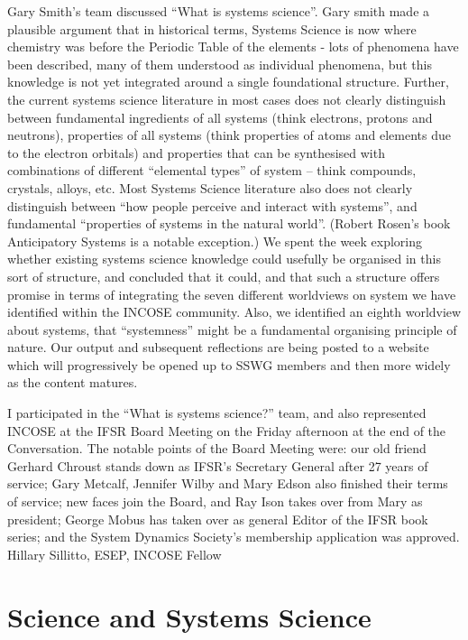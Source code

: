 Gary Smith’s team discussed ``What is systems science''. Gary smith made a plausible argument that in historical terms, Systems Science is now where chemistry was before the Periodic Table of the elements - lots of phenomena have been described, many of them understood as individual phenomena, but this knowledge is not yet integrated around a single foundational structure. Further, the current systems science literature in most cases does not clearly distinguish between fundamental ingredients of all systems (think electrons, protons and neutrons), properties of all systems (think properties of atoms and elements due to the electron orbitals) and properties that can be synthesised with combinations of different ``elemental types'' of system – think compounds, crystals, alloys, etc. Most Systems Science literature also does not clearly distinguish between ``how people perceive and interact with systems'', and fundamental ``properties of systems in the natural world''. (Robert Rosen’s book Anticipatory Systems is a notable exception.) We spent the week exploring whether existing systems science knowledge could usefully be organised in this sort of structure, and concluded that it could, and that such a structure offers promise in terms of integrating the seven different worldviews on system we have identified within the INCOSE community. Also, we identified an eighth worldview about systems, that ``systemness'' might be a fundamental organising principle of nature. Our output and subsequent reflections are being posted to a website which will progressively be opened up to SSWG members and then more widely as the content matures.

I participated in the “What is systems science?” team, and also represented INCOSE at the IFSR Board Meeting on the Friday afternoon at the end of the Conversation. The notable points of the Board Meeting were: our old friend Gerhard Chroust stands down as IFSR’s Secretary General after 27 years of service; Gary Metcalf, Jennifer Wilby and Mary Edson also finished their terms of service; new faces join the Board, and Ray Ison takes over from Mary as president; George Mobus has taken over as general Editor of the IFSR book series; and the System Dynamics Society’s membership application was approved. Hillary Sillitto, ESEP, INCOSE Fellow


\section{Science and Systems Science}

